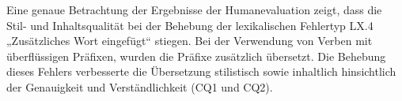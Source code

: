 \begin{figure}





















\captionsetup{width=.45\textwidth}
\begin{floatrow}
\end{floatrow}
\end{figure}

Eine genaue Betrachtung der Ergebnisse der Humanevaluation zeigt, dass die Stil- und Inhaltsqualität bei der Behebung der lexikalischen Fehlertyp LX.4 „Zusätzliches Wort eingefügt“ stiegen. Bei der Verwendung von Verben mit überflüssigen Präfixen, wurden die Präfixe zusätzlich übersetzt. Die Behebung dieses Fehlers verbesserte die Übersetzung stilistisch sowie inhaltlich hinsichtlich der Genauigkeit und Verständlichkeit (CQ1 und CQ2).


